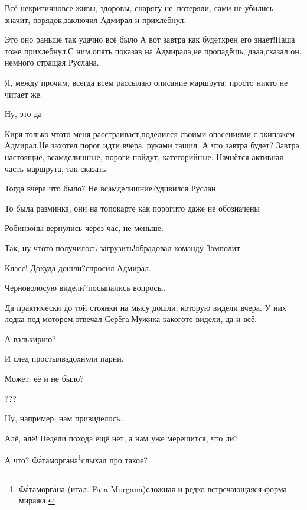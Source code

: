 \diagdash Всё некритично\mdash все живы, здоровы, снарягу не~потеряли, сами не убились, значит, порядок,\mdash заключил Адмирал и прихлебнул.

\diagdash Это оно раньше так удачно всё было\myldots{} А вот завтра как будет\mdash хрен его знает!\mdash Паша тоже прихлебнул.\mdash С ним,\mdash опять показав на Адмирала,\mdash не пропадёшь, да\sdash а\sdash а,\mdash сказал он, немного стращая Руслана.

\diagdash Я, между прочим, всегда всем рассылаю описание маршрута, просто никто не читает же.

\diagdash Ну, это да\myldots{}

\diagdash Киря только что\sdash то меня расстраивает,\mdash поделился своими опасениями с экипажем Адмирал.\mdash Не захотел порог идти вчера, руками тащил. А что завтра будет? Завтра настоящие, всамделишные, пороги пойдут, категорийные. Начнётся активная часть маршрута, так сказать.

\diagdash Тогда вчера что было? Не всамделишние?\mdash удивился Руслан.

\diagdash То была разминка, они на топокарте как пороги\sdash то даже не обозначены\myldots{}

\vspace{0.5cm}
\myldots{}Робинзоны вернулись через час, не меньше:

\diagdash Так, ну что\sdash то получилось загрузить!\mdash обрадовал команду Замполит.

\diagdash Класс! Докуда дошли?\mdash спросил Адмирал.

\diagdash Черноволосую видели?\mdash посыпались вопросы.

\diagdash Да практически до той стоянки на мысу дошли, которую видели вчера. У них лодка под мотором,\mdash отвечал Серёга.\mdash Мужика какого\sdash то видели, да и всё.

\diagdash А валькирию?

\diagdash И след простыл\myldots{}\mdash вздохнули парни.

\diagdash Может, её и не было?

\diagdash ???

\diagdash Ну, например, нам привиделось.

\diagdash Алё, алё! Недели похода ещё нет, а нам уже мерещится, что ли?

\renewcommand*{\thefootnote}{\fnsymbol{footnote}}
\setcounter{footnote}{0}

\diagdash А что? Ф\'ата\sdash морг\'ана\footnote{Ф\'ата\sdash морг\'ана (итал. Fata Morgana)\mdash сложная и редко встречающаяся форма миража.}\mdash слыхал про такое?

